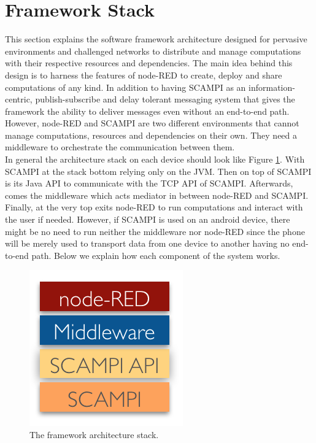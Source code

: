 \section{Framework Stack}\label{sec:design}
This section explains the software framework architecture designed for pervasive environments and challenged networks to distribute and manage computations with their respective resources and dependencies.  The main idea behind this design is to harness the features of node-RED to create, deploy and share computations of any kind. In addition to having SCAMPI as an information-centric, publish-subscribe and delay tolerant messaging system that gives the framework the ability to deliver messages even without an end-to-end path. However, node-RED and SCAMPI are two different environments that cannot manage computations, resources and dependencies on their own. They need a middleware to orchestrate the communication between them.\\


\noindent In general the architecture stack on each device should look like Figure \ref{fig:stack}. With SCAMPI at the stack bottom relying only on the JVM. Then on top of SCAMPI is its Java API to communicate with the TCP API of SCAMPI. Afterwards, comes the middleware which acts mediator in between node-RED and SCAMPI. Finally, at the very top exits node-RED to run computations and interact with the user if needed. However, if SCAMPI is used on an android device, there might be no need to run neither the middleware nor node-RED since the phone will be  merely used to transport data from one device to another having no end-to-end path. Below we explain how each component of the system works.
\begin{figure}[H]
	\centering
	\includegraphics[scale=0.8]{images/stack.png}
	\caption{The framework architecture stack.  }
	\label{fig:stack}
\end{figure}



